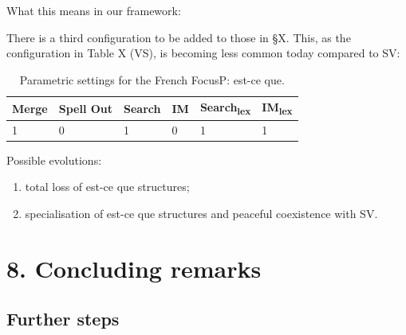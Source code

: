 \documentclass[fleqn,10pt]{wlscirep}
\begin{document}
\noindent What this means in our framework:

\noindent There is a third configuration to be added to those in §X. This, as the configuration in Table X (VS), is becoming less common today compared to SV:

\begin{table}[H]
    \centering
    \begin{tabular}{|l|l|l|l|l|l|}
    \hline
    Merge & Spell Out & Search & IM & Search\textsubscript{lex} & IM\textsubscript{lex} \\
    \hline
    1 & 0 & 1 & 0 & 1 & 1 \\
    \hline
    \end{tabular}
    \caption{\label{tab:samp}Parametric settings for the French FocusP: est-ce que.}
\end{table}

\noindent Possible evolutions:

\begin{enumerate}
    \item \vspace*{-2mm} total loss of est-ce que structures;
    \item \vspace*{-2mm} specialisation of est-ce que structures and peaceful coexistence with SV.
\end{enumerate}

\section*{8. Concluding remarks}

\subsection*{Further steps}
\end{document}

